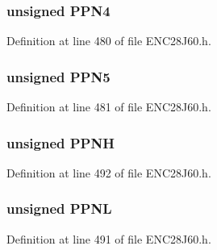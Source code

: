 \hypertarget{union_p_h_y_r_e_g_a24199b52e1051557bfd5b55411d92539}{}
\subsubsection[{P\+P\+N4}]{\setlength{\rightskip}{0pt plus 5cm}unsigned P\+P\+N4}\label{union_p_h_y_r_e_g_a24199b52e1051557bfd5b55411d92539}


Definition at line 480 of file E\+N\+C28\+J60.\+h.

\hypertarget{union_p_h_y_r_e_g_a90d1acdaa2ce03ffa50605eb588907f1}{}
\subsubsection[{P\+P\+N5}]{\setlength{\rightskip}{0pt plus 5cm}unsigned P\+P\+N5}\label{union_p_h_y_r_e_g_a90d1acdaa2ce03ffa50605eb588907f1}


Definition at line 481 of file E\+N\+C28\+J60.\+h.

\hypertarget{union_p_h_y_r_e_g_af0a77f67f7a1ebcfd6dc96aeeaa7c8a5}{}
\subsubsection[{P\+P\+N\+H}]{\setlength{\rightskip}{0pt plus 5cm}unsigned P\+P\+N\+H}\label{union_p_h_y_r_e_g_af0a77f67f7a1ebcfd6dc96aeeaa7c8a5}


Definition at line 492 of file E\+N\+C28\+J60.\+h.

\hypertarget{union_p_h_y_r_e_g_acce38267d2eed83475ce4072862d66de}{}
\subsubsection[{P\+P\+N\+L}]{\setlength{\rightskip}{0pt plus 5cm}unsigned P\+P\+N\+L}\label{union_p_h_y_r_e_g_acce38267d2eed83475ce4072862d66de}


Definition at line 491 of file E\+N\+C28\+J60.\+h.

\hypertarget{union_p_h_y_r_e_g_ae7c15f2966e7ea51ac4c408049bb6f78}{}
